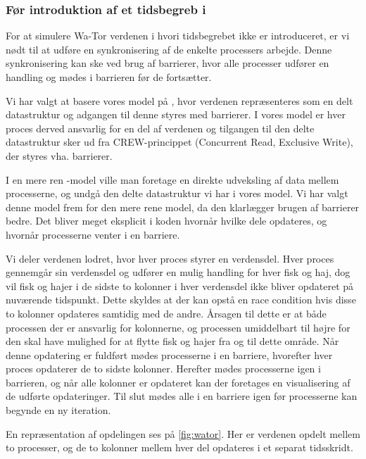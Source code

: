 \subsubsection{Før introduktion af et tidsbegreb i \pycsp}
For at simulere Wa-Tor verdenen i \pycsp hvori tidsbegrebet ikke er introduceret, er vi nødt 
til at udføre en synkronisering af de enkelte processers arbejde. Denne 
synkronisering kan ske ved brug af barrierer, hvor alle processer udfører en 
handling og mødes i barrieren før de fortsætter.

Vi har valgt at basere vores model på \cite{crew}, hvor verdenen repræsenteres 
som en delt datastruktur og adgangen til denne styres med barrierer. I vores 
model er hver proces derved ansvarlig for en del af verdenen og tilgangen til 
den delte datastruktur sker ud fra CREW-princippet (Concurrent Read, Exclusive 
Write)\cite[5]{crew}, der styres vha. barrierer.  

I en mere ren \csp-model ville man foretage en direkte udveksling af data mellem 
processerne, og undgå den delte datastruktur vi har i vores model.  Vi har 
valgt denne model frem for den mere rene \csp model, da den klarlægger brugen af 
barrierer bedre.  Det bliver meget eksplicit i koden hvornår hvilke dele 
opdateres, og hvornår processerne venter i en barriere.

Vi deler verdenen lodret, hvor hver proces styrer en verdensdel. Hver proces 
gennemgår sin verdensdel og udfører en mulig handling for hver fisk og haj, dog 
vil fisk og hajer i de sidste to kolonner i hver verdensdel ikke bliver 
opdateret på nuværende tidspunkt. Dette skyldes at der kan opstå en race 
condition hvis disse to kolonner opdateres samtidig med de andre. Årsagen til 
dette er at både processen der er ansvarlig for kolonnerne, og processen 
umiddelbart til højre for den skal have mulighed for at flytte fisk og hajer fra og til dette område. 
Når denne 
opdatering er fuldført mødes processerne i en barriere, hvorefter hver proces 
opdaterer de to sidste kolonner. Herefter mødes processerne igen i barrieren, 
og når alle kolonner er opdateret kan der foretages en visualisering af de 
udførte opdateringer. Til slut mødes alle i en barriere igen før processerne 
kan begynde en ny iteration.

En repræsentation af opdelingen ses på \cref{fig:wator}. Her er verdenen 
opdelt mellem to processer, og de to kolonner mellem hver del opdateres i et 
separat tidsskridt.  

